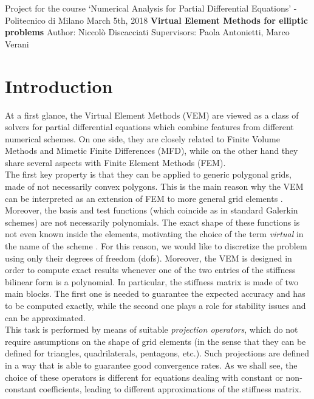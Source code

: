 \documentclass[10pt]{article}
\begin{document}
{\Large Project for the course `Numerical Analysis for Partial Differential Equations' - Politecnico di Milano} \vspace{10pt} \newline
{\Large March 5th, 2018} \vspace{10pt} \newline
{\textbf{\LARGE Virtual Element Methods for elliptic problems} } \vspace{10pt} \newline
{\Large Author: Niccolò Discacciati} \vspace{10pt} \newline
{\Large Supervisors: Paola Antonietti, Marco Verani}
\vspace{30pt}

\section{Introduction} \label{sec:introduction}
At a first glance, the Virtual Element Methods (VEM) are viewed as a class of solvers for partial differential equations which combine features from different numerical schemes. On one side, they are closely related to Finite Volume Methods and Mimetic Finite Differences (MFD), while on the other hand they share several aspects with Finite Element Methods (FEM). \\
The first key property is that they can be applied to generic polygonal grids, made of not necessarily convex polygons. This is the main reason why the VEM can be interpreted as an extension of FEM to more general grid elements \cite{Basic_principles}. \\
Moreover, the basis and test functions (which coincide as in standard Galerkin schemes) are not necessarily polynomials. The exact shape of these functions is not even known inside the elements, motivating the choice of the term \textit{virtual} in the name of the scheme \cite{hitchhiker}. For this reason, we would like to discretize the problem using only their degrees of freedom (dofs). Moreover, the VEM is designed in order to compute exact results whenever one of the two entries of the stiffness bilinear form is a polynomial. In particular, the stiffness matrix is made of two main blocks. The first one is needed to guarantee the expected accuracy and has to be computed exactly, while the second one plays a role for stability issues and can be approximated. \\
This task is performed by means of suitable \textit{projection operators}, which do not require assumptions on the shape of grid elements (in the sense that they can be defined for triangles, quadrilaterals, pentagons, etc.). Such projections are defined in a way that is able to guarantee good convergence rates. As we shall see, the choice of these operators is different for equations dealing with constant or non-constant coefficients, leading to different approximations of the stiffness matrix. \\
\end{document}
